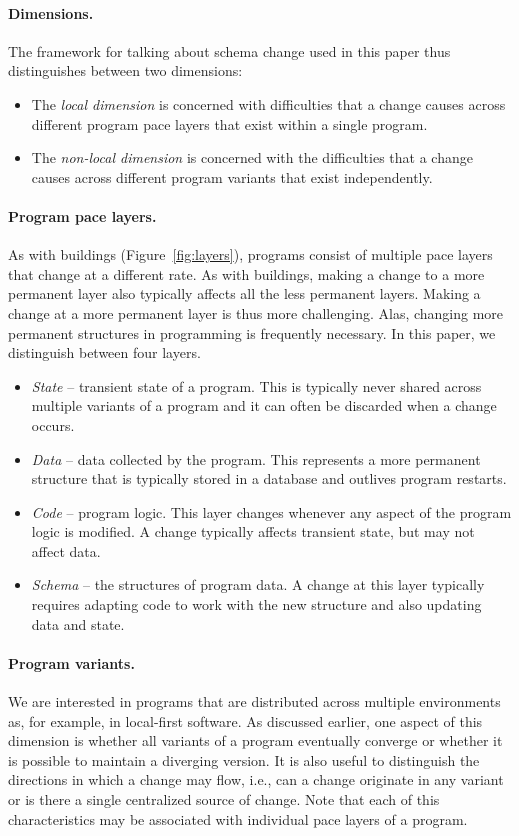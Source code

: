 \documentclass[english,submission]{programming}
\begin{document}
\paragraph{Dimensions.}
The framework for talking about schema change used in this paper thus distinguishes between
two dimensions:

\begin{itemize}
  \item The \emph{local dimension} is concerned with difficulties that a change causes
    across different program pace layers that exist within a single program.
  \item The \emph{non-local dimension} is concerned with the difficulties that a change causes
    across different program variants that exist independently.
\end{itemize}

\paragraph{Program pace layers.} As with buildings (Figure~\ref{fig:layers}), programs consist
of multiple pace layers that change at a different rate. As with buildings, making a change
to a more permanent layer also typically affects all the less permanent layers. Making a change
at a more permanent layer is thus more challenging. Alas, changing more permanent structures in
programming is frequently necessary. In this paper, we distinguish between four layers.

\begin{itemize}
\item \emph{State} -- transient state of a program. This is typically never shared across
  multiple variants of a program and it can often be discarded when a change occurs.
\item \emph{Data} -- data collected by the program. This represents a more permanent structure
  that is typically stored in a database and outlives program restarts.
\item \emph{Code} -- program logic. This layer changes whenever any aspect of the program logic
  is modified. A change typically affects transient state, but may not affect data.
\item \emph{Schema} -- the structures of program data. A change at this layer typically
  requires adapting code to work with the new structure and also updating data and state.
\end{itemize}

\paragraph{Program variants.} We are interested in programs that are distributed across multiple
environments as, for example, in local-first software. As discussed earlier, one aspect of this
dimension is whether all variants of a program eventually converge or whether it is possible to
maintain a diverging version. It is also useful to distinguish the directions in which a
change may flow, i.e., can a change originate in any variant or is there a single centralized
source of change. Note that each of this characteristics may  be associated with individual pace
layers of a program.
\end{document}
